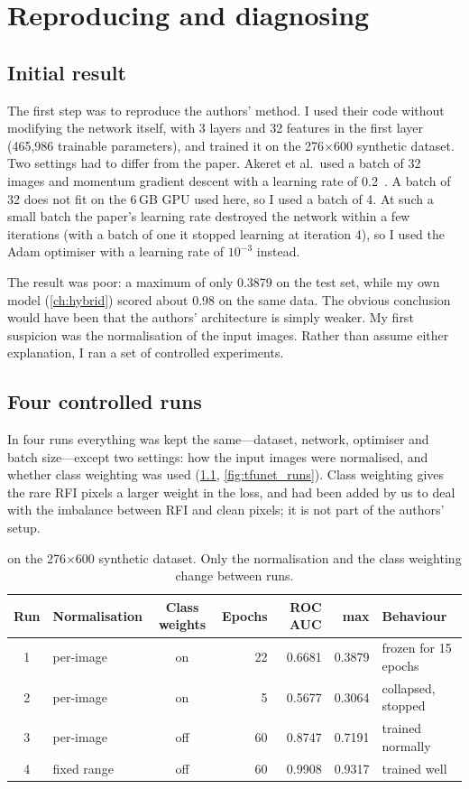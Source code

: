 \chapter{Reproducing and diagnosing \tfunet}
\label{ch:tfunet}

\section{Initial result}
The first step was to reproduce the authors' method. I used their \tfunet{}
code without modifying the network itself, with 3 layers and 32 features in
the first layer (465{,}986 trainable parameters), and trained it on the
276$\times$600 synthetic dataset. Two settings had to differ from the paper.
Akeret et al.\ used a batch of 32 images and momentum gradient descent with a
learning rate of 0.2~\cite{akeret2017}. A batch of 32 does not fit on the
6\,GB GPU used here, so I used a batch of 4. At such a small batch the paper's
learning rate destroyed the network within a few iterations (with a batch of
one it stopped learning at iteration 4), so I used the Adam optimiser with a
learning rate of $10^{-3}$ instead.

The result was poor: a maximum \Fone{} of only 0.3879 on the test set, while my
own model (\cref{ch:hybrid}) scored about 0.98 on the same data. The obvious
conclusion would have been that the authors' architecture is simply weaker.
My first suspicion was the normalisation of the input images. Rather than
assume either explanation, I ran a set of controlled experiments.

\section{Four controlled runs}
In four runs everything was kept the same---dataset, network, optimiser and
batch size---except two settings: how the input images were normalised, and
whether class weighting was used (\cref{tab:tfunet_runs},
\cref{fig:tfunet_runs}). Class weighting gives the rare RFI pixels a larger
weight in the loss, and had been added by us to deal with the imbalance
between RFI and clean pixels; it is not part of the authors' setup.

\begin{table}[H]
  \centering
  \caption{\tfunet{} on the 276$\times$600 synthetic dataset. Only the
    normalisation and the class weighting change between runs.}
  \label{tab:tfunet_runs}
  \small
  \begin{tabular}{clcrrrl}
    \toprule
    Run & Normalisation & Class weights & Epochs & ROC AUC & max \Fone{} & Behaviour \\
    \midrule
    1 & per-image   & on  & 22 & 0.6681 & 0.3879 & frozen for 15 epochs \\
    2 & per-image   & on  & 5  & 0.5677 & 0.3064 & collapsed, stopped \\
    3 & per-image   & off & 60 & 0.8747 & 0.7191 & trained normally \\
    4 & fixed range & off & 60 & 0.9908 & 0.9317 & trained well \\
    \bottomrule
  \end{tabular}
\end{table}


